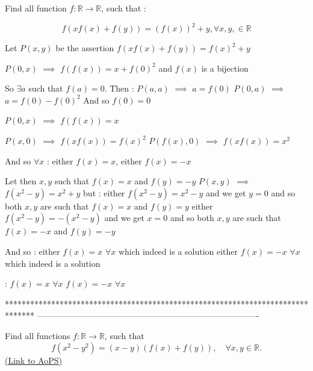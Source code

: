 \begin{solution}
	\begin{tcolorbox}Find all function $f : \mathbb{R} \rightarrow \mathbb{R}$, such that :

\[ f(xf(x) + f(y)) = (f(x))^2 + y, \forall x, y, \in \mathbb{R} \]\end{tcolorbox}
Let $P(x,y)$ be the assertion $f(xf(x)+f(y))=f(x)^2+y$

$P(0,x)$ $\implies$ $f(f(x))=x+f(0)^2$ and $f(x)$ is a bijection

So $\exists a$ such that $f(a)=0$. Then :
$P(a,a)$ $\implies$ $a=f(0)$
$P(0,a)$ $\implies$ $a=f(0)-f(0)^2$
And so $f(0)=0$

$P(0,x)$ $\implies$ $f(f(x))=x$

$P(x,0)$ $\implies$ $f(xf(x))=f(x)^2$
$P(f(x),0)$ $\implies$ $f(xf(x))=x^2$

And so $\forall x$ : either $f(x)=x$, either $f(x)=-x$

Let then $x,y$ such that $f(x)=x$ and $f(y)=-y$
$P(x,y)$ $\implies$ $f(x^2-y)=x^2+y$ but :
either $f(x^2-y)=x^2-y$ and we get $y=0$ and so both $x,y$ are such that $f(x)=x$ and $f(y)=y$
either $f(x^2-y)=-(x^2-y)$ and we get $x=0$ and so both $x,y$ are such that $f(x)=-x$ and $f(y)=-y$

And so :
either $f(x)=x$ $\forall x$ which indeed is a solution
either $f(x)=-x$ $\forall x$ which indeed is a solution

 :
$f(x)=x$ $\forall x$ 
$f(x)=-x$ $\forall x$
\end{solution}
*******************************************************************************
-------------------------------------------------------------------------------

\begin{problem}
	Find all functions $f : \mathbb{R} \to\mathbb{R}$, such that
\[ f(x^2 - y^2) = (x - y)(f(x) + f(y)), \quad \forall x, y \in \mathbb{R}.\]
	\flushright \href{https://artofproblemsolving.com/community/c6h442809}{(Link to AoPS)}
\end{problem}



